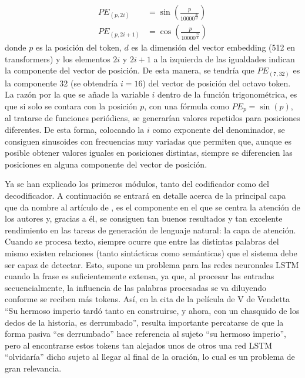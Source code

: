 $$
\begin{aligned}
PE_{(p, 2i)} & = \sin\left(\frac{p}{10000^{\frac{2i}{d}}}\right)\\
PE_{(p, 2i + 1)} & = \cos\left(\frac{p}{10000^{\frac{2i}{d}}}\right)
\end{aligned}
$$
donde $p$ es la posición del token, $d$ es la dimensión del vector embedding (512 en transformers) y los elementos $2i$ y $2i+1$ a la izquierda de las igualdades indican la componente del vector de posición. De esta manera, se tendría que $PE_{(7, 32)}$ es la componente 32 (se obtendría $i=16$) del vector de posición del octavo token. La razón por la que se añade la variable $i$ dentro de la función trigonométrica, es que si solo se contara con la posición $p$, con una fórmula como $PE_p=\sin(p)$, al tratarse de funciones periódicas, se generarían valores repetidos para posiciones diferentes. De esta forma, colocando la $i$ como exponente del denominador, se consiguen sinusoides con frecuencias muy variadas que permiten que, aunque es posible obtener valores iguales en posiciones distintas, siempre se diferencien las posiciones en alguna componente del vector de posición.

Ya se han explicado los primeros módulos, tanto del codificador como del decodificador. A continuación se entrará en detalle acerca de la principal capa que da nombre al artículo de \cite{transformers}, es el componente en el que se centra la atención de los autores y, gracias a él, se consiguen tan buenos resultados y tan excelente rendimiento en las tareas de generación de lenguaje natural: la capa de atención. Cuando se procesa texto, siempre ocurre que entre las distintas palabras del mismo existen relaciones (tanto sintácticas como semánticas) que el sistema debe ser capaz de detectar. Esto, supone un problema para las redes neuronales LSTM cuando la frase es suficientemente extensa, ya que, al procesar las entradas secuencialmente, la influencia de las palabras procesadas se va diluyendo conforme se reciben más tokens. Así, en la cita de la película de V de Vendetta ``Su hermoso imperio tardó tanto en construirse, y ahora, con un chasquido de los dedos de la historia, es derrumbado'', resulta importante percatarse de que la forma pasiva ``es derrumbado'' hace referencia al sujeto ``su hermoso imperio'', pero al encontrarse estos tokens tan alejados unos de otros una red LSTM ``olvidaría'' dicho sujeto al llegar al final de la oración, lo cual es un problema de gran relevancia.

